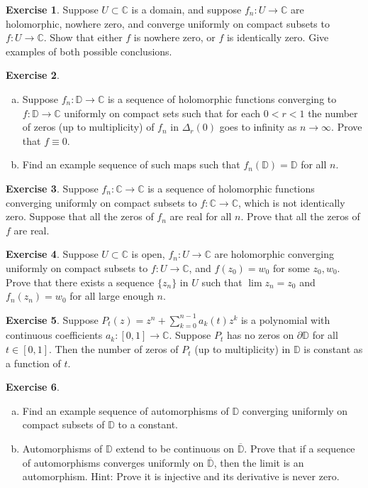 \documentclass[12pt,openany]{book}
\newcommand{\C}{{\mathbb{C}}}
\newcommand{\D}{{\mathbb{D}}}
\theoremstyle{plain}
\theoremstyle{remark}
\theoremstyle{definition}
\newenvironment{exbox}{%
    \def\FrameCommand{\vrule width 1pt \relax\hspace{10pt}}%
    \MakeFramed{\advance\hsize-\width\FrameRestore}%
}{%
    \endMakeFramed
}
\newenvironment{exparts}{%
    \leavevmode\begin{enumerate}[a),noitemsep,topsep=0pt,parsep=0pt,partopsep=0pt]
}{%
    \end{enumerate}
}
\theoremstyle{exercise}
\newtheorem{exercise}{Exercise}[section]
\theoremstyle{example}
\begin{document}
\begin{exbox}
\begin{exercise}
Suppose $U \subset \C$ is a domain,
and suppose
$f_n \colon U \to \C$ are holomorphic, nowhere zero,
and converge uniformly on compact subsets to $f \colon U \to \C$.
Show that either $f$ is nowhere zero, or $f$ is identically zero.
Give examples of both possible conclusions.
\end{exercise}

\begin{exercise}
\begin{exparts}
\item
Suppose $f_n \colon \D \to \C$ is a sequence of holomorphic functions converging
to $f \colon \D \to \C$ uniformly on compact sets such that
for each $0 < r < 1$ the number of zeros (up to multiplicity)
of $f_n$ in $\Delta_r(0)$ goes to infinity as $n \to \infty$.
Prove that $f \equiv 0$.
\item
Find an example sequence of such maps such that $f_n(\D) = \D$
for all $n$.
\end{exparts}
\end{exercise}

\begin{exercise}
Suppose 
$f_n \colon \C \to \C$ is a sequence of holomorphic
functions
converging uniformly on compact subsets to $f \colon \C \to \C$,
which is not identically zero.
Suppose that all the zeros of $f_n$ are real for all $n$.
Prove that all the zeros of $f$ are real.
\end{exercise}

\begin{exercise}
Suppose $U \subset \C$ is open,
$f_n \colon U \to \C$ are holomorphic
converging uniformly on compact subsets to $f \colon U \to \C$,
and $f(z_0) = w_0$ for some $z_0, w_0$.  
Prove that there exists a sequence $\{ z_n \}$ in $U$ such that
$\lim z_n = z_0$ and $f_n(z_n) = w_0$ for all large enough $n$.
\end{exercise}

\begin{exercise}
Suppose $P_t(z) = z^n + \sum_{k=0}^{n-1} a_k(t) z^k$ is a polynomial
with continuous coefficients $a_k \colon [0,1] \to \C$.  Suppose $P_t$ has
no zeros on $\partial \D$ for all $t \in [0,1]$.  Then the number of zeros
of $P_t$ (up to multiplicity) in $\D$ is constant as a function of $t$.
\end{exercise}

\begin{exercise}
\begin{exparts}
\item
Find an example sequence of automorphisms of $\D$ converging
uniformly on compact subsets of $\D$ to a constant.
\item
Automorphisms of $\D$ extend to be continuous on
$\overline{\D}$.  Prove that if a sequence
of automorphisms converges uniformly on $\overline{\D}$, then
the limit is an automorphism. Hint: Prove it is injective
and its derivative is never zero.
\end{exparts}
\end{exercise}


\end{exbox}
\end{document}
